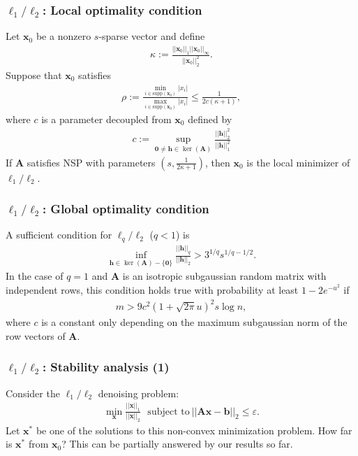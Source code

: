 \documentclass[11pt]{beamer}
\def\A{{\mathbf A}}
\def\x{{\mathbf x}}
\def\b{{\mathbf b}}
\def\h{{\mathbf{h}}}
\def\e{{\varepsilon}}
\begin{document}
\begin{frame}
\frametitle{$\ell_1/\ell_2$: Local optimality condition}

\begin{Theorem}
Let $\x_0$ be a nonzero $s$-sparse vector and define
\begin{align*}
\kappa:=\frac{||\x_0||_1||\x_0||_\infty}{||\x_0||^2_2}.
\end{align*}
Suppose that $\x_0$ satisfies  
\begin{align*}
\rho:=\frac{\min_{i\in\text{supp}(\x_0)}|x_i|}{\max_{i\in\text{supp}(\x_0)}|x_i|}\leq\frac{1}{2c(\kappa+1)},
\end{align*}
where $c$ is a parameter decoupled from $\x_0$ defined by 
\begin{align*}
c:=\sup_{\mathbf{0}\neq \h\in\ker(\A)}\frac{||\h||^2_2}{||\h||_1^2}
\end{align*}
If $\A$ satisfies NSP with parameters $(s, \frac{1}{2\kappa+1})$, then $\x_0$ is the local minimizer of $\ell_1/\ell_2$.   
\end{Theorem}

\end{frame}

\begin{frame}
\frametitle{$\ell_1/\ell_2$: Global optimality condition}

\begin{Theorem}
A sufficient condition for $\ell_q/\ell_2$ ($q<1$) is
\begin{align*}
\inf_{\h\in\ker(\A)-\{\mathbf{0}\}}\frac{||\h||_q}{||\h||_2}>3^{1/q}s^{1/q-1/2}.
\end{align*}
In the case of $q=1$ and $\A$ is an isotropic subgaussian random matrix with independent rows, this condition holds true with probability at least $1-2e^{-u^2}$ if
\begin{align*}
m>9c^2(1+\sqrt{2\pi}u)^2s\log n,
\end{align*}
where $c$ is a constant only depending on the maximum subgaussian norm of the row vectors of $\A$. 
\end{Theorem} 
\end{frame}



\begin{frame}
\frametitle{$\ell_1/\ell_2$: Stability analysis (1)}

Consider the $\ell_1/\ell_2$ denoising problem:
\begin{align*}
\min_{\x}\frac{||\x||_1}{||\x||_2}\ \ \ \text{subject to}\ ||\A\x-\b||_2\leq\e.
\end{align*}
Let $\x^*$ be one of the solutions to this non-convex minimization problem. How far is $\x^*$ from $\x_0$? This can be partially answered by our results so far.  


\end{frame}
\end{document}

